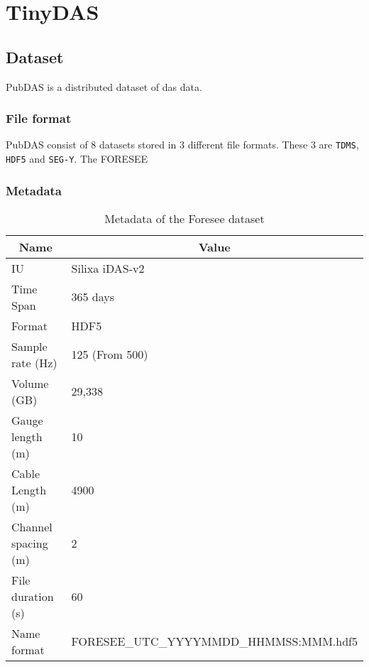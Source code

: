 \section{TinyDAS}


\subsection{Dataset}

PubDAS \cite{spica2023pubdas} is a distributed dataset of \acrfull{das} data. 



\subsubsection{File format}

PubDAS consist of 8 datasets stored in 3 different file formats. These 3 are \texttt{TDMS}, \texttt{HDF5} and \texttt{SEG-Y}. 
The FORESEE

\subsubsection{Metadata}

\begin{table}[h]
    \small
    \centering
    \begin{tabular}{|l|l|}
    \toprule
    \multicolumn{1}{|c|}{\textbf{Name}} & \multicolumn{1}{c|}{\textbf{Value}} \\ \hline
    IU                                  & Silixa iDAS-v2                      \\ \hline
    Time Span                           & 365 days                            \\ \hline
    Format                              & HDF5                                \\ \hline
    Sample rate (Hz)                    & 125 (From 500)                      \\ \hline
    Volume (GB)                         & 29,338                              \\ \hline
    Gauge length (m)                    & 10                                  \\ \hline
    Cable Length (m)                    & 4900                                \\ \hline
    Channel spacing (m)                 & 2                                   \\ \hline
    File duration (s)                   & 60                                  \\ \hline
    Name format                         & FORESEE\_UTC\_YYYYMMDD\_HHMMSS:MMM.hdf5 \\ 
    \bottomrule
    \end{tabular}
    \caption{Metadata of the Foresee dataset}
    \label{tab:foresee_meta}
\end{table}

